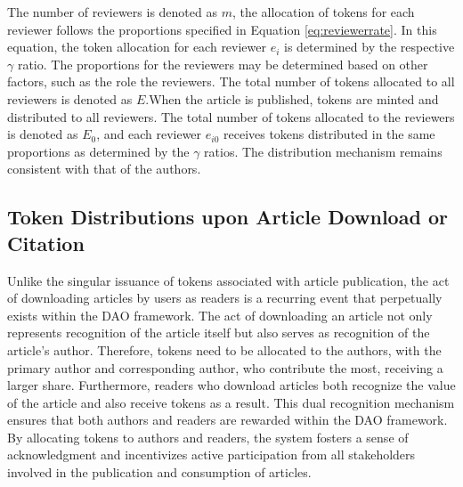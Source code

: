 \documentclass[lettersize,journal]{IEEEtran}
\begin{document}
The number of reviewers is denoted as $m$, the allocation of tokens for each reviewer follows the proportions specified in Equation \ref{eq:reviewerrate}. In this equation, the token allocation for each reviewer $e_i$ is determined by the respective $\gamma$ ratio. The proportions for the reviewers may be determined based on other factors, such as the role the reviewers. The total number of tokens allocated to all reviewers is denoted as $E$.When the article is published, tokens are minted and distributed to all reviewers. The total number of tokens allocated to the reviewers is denoted as $E_0$, and each reviewer $e_{i0}$ receives tokens distributed in the same proportions as determined by the $\gamma$ ratios. The distribution mechanism remains consistent with that of the authors.

\subsection{Token Distributions upon Article Download or Citation}

Unlike the singular issuance of tokens associated with article publication, the act of downloading articles by users as readers is a recurring event that perpetually exists within the DAO framework. The act of downloading an article not only represents recognition of the article itself but also serves as recognition of the article's author. Therefore, tokens need to be allocated to the authors, with the primary author and corresponding author, who contribute the most, receiving a larger share.
Furthermore, readers who download articles both recognize the value of the article and also receive tokens as a result. This dual recognition mechanism ensures that both authors and readers are rewarded within the DAO framework. By allocating tokens to authors and readers, the system fosters a sense of acknowledgment and incentivizes active participation from all stakeholders involved in the publication and consumption of articles.
\end{document}
